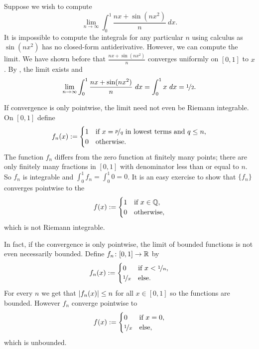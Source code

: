 \begin{example}
Suppose we wish to compute
\begin{equation*}
\lim_{n\to\infty} \int_0^1 \frac{nx+ \sin(nx^2)}{n} ~dx .
\end{equation*}
It is impossible to compute the integrals for any particular $n$ using 
calculus as $\sin(nx^2)$ has no closed-form antiderivative.  However,
we can compute the limit.
We have shown before that $\frac{nx+ \sin(nx^2)}{n}$ converges uniformly
on $[0,1]$ to $x$.
By , the limit exists and
\begin{equation*}
\lim_{n\to\infty} \int_0^1 \frac{nx+ \sin(nx^2)}{n} ~dx
=
\int_0^1
x ~dx = \nicefrac{1}{2} .
\end{equation*}
\end{example}

\begin{example}
If convergence is only pointwise, the limit need not even be Riemann
integrable.  On $[0,1]$ define
\begin{equation*}
f_n(x) :=
\begin{cases}
1 & \text{if } x = \nicefrac{p}{q} \text{ in lowest terms and } q \leq n, \\
0 & \text{otherwise.}
\end{cases}
\end{equation*}
The function $f_n$ differs from the zero function at finitely many points;
there are only finitely many fractions in $[0,1]$ with denominator less than
or equal to $n$.   So $f_n$ is integrable and $\int_0^1 f_n = \int_0^1 0 =
0$.  It is an easy exercise to show that $\{ f_n \}$ converges pointwise to the
\begin{equation*}
f(x) :=
\begin{cases}
1 & \text{if } x \in {\mathbb{Q}}, \\
0 & \text{otherwise,}
\end{cases}
\end{equation*}
which is not Riemann integrable.
\end{example}

\begin{example}
In fact, if the convergence is only pointwise, the limit of bounded
functions is not even necessarily bounded.
Define $f_n \colon [0,1] \to {\mathbb{R}}$ by
\begin{equation*}
f_n(x) :=
\begin{cases}
0 & \text{if } x < \nicefrac{1}{n},\\
\nicefrac{1}{x} & \text{else.}
\end{cases}
\end{equation*}
For every $n$ we get that $\left\lvert {f_n(x)} \right\rvert \leq n$ for all $x \in [0,1]$ so the
functions are bounded.  However $f_n$ converge pointwise to
\begin{equation*}
f(x) :=
\begin{cases}
0 & \text{if } x = 0,\\
\nicefrac{1}{x} & \text{else,}
\end{cases}
\end{equation*}
which is unbounded.
\end{example}

